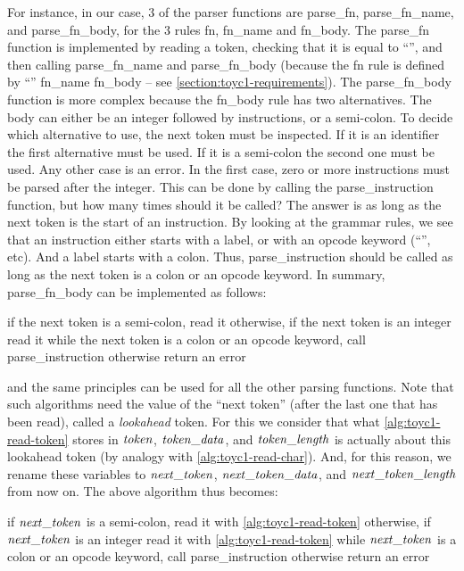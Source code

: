 For instance, in our case, 3 of the parser functions are parse\_fn,
parse\_fn\_name, and parse\_fn\_body, for the 3 rules fn, fn\_name and
fn\_body. The parse\_fn function is implemented by reading a token, checking
that it is equal to ``'', and then calling parse\_fn\_name and
parse\_fn\_body (because the fn rule is defined by ``'' fn\_name
fn\_body -- see \cref{section:toyc1-requirements}). The parse\_fn\_body
function is more complex because the fn\_body rule has two alternatives. The
body can either be an integer followed by instructions, or a semi-colon. To
decide which alternative to use, the next token must be inspected. If it is an
identifier the first alternative must be used. If it is a semi-colon the second
one must be used. Any other case is an error. In the first case, zero or more
instructions must be parsed after the integer. This can be done by calling the
parse\_instruction function, but how many times should it be called? The answer
is as long as the next token is the start of an instruction. By looking at the
grammar rules, we see that an instruction either starts with a label, or with
an opcode keyword (``'', etc). And a label starts with a colon.
Thus, parse\_instruction should be called as long as the next token is a colon
or an opcode keyword. In summary, parse\_fn\_body can be implemented as follows:
\begin{algorithmic}[1]
\State if the next token is a semi-colon, read it
\Begin otherwise, if the next token is an integer
  \State read it
  \State while the next token is a colon or an opcode keyword, call
    parse\_instruction
\End
\State otherwise return an error
\end{algorithmic}
and the same principles can be used for all the other parsing functions. Note
that such algorithms need the value of the ``next token'' (after the last one
that has been read), called a {\em lookahead} token. For this we consider that
what \cref{alg:toyc1-read-token} stores in $\it{token}$, $\it{token\_data}$,
and $\it{token\_length}$ is actually about this lookahead token (by analogy
with \cref{alg:toyc1-read-char}). And, for this reason, we rename these
variables to $\it{next\_token}$, $\it{next\_token\_data}$, and
$\it{next\_token\_length}$ from now on. The above algorithm thus becomes:
\begin{algorithmic}[1]
\State if $\it{next\_token}$ is a semi-colon, read it with
  \cref{alg:toyc1-read-token}
\Begin otherwise, if $\it{next\_token}$ is an integer
  \State read it with \cref{alg:toyc1-read-token}
  \State while $\it{next\_token}$ is a colon or an opcode keyword, call
     parse\_instruction
\End
\State otherwise return an error
\end{algorithmic}

